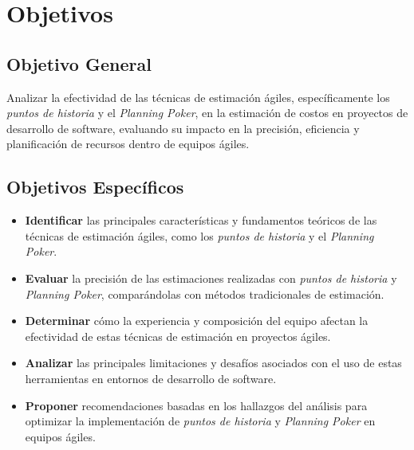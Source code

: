 \chapter{Objetivos}
\section{Objetivo General}

Analizar la efectividad de las técnicas de estimación ágiles, específicamente los \textit{puntos de historia} y el \textit{Planning Poker}, en la estimación de costos en proyectos de desarrollo de software, evaluando su impacto en la precisión, eficiencia y planificación de recursos dentro de equipos ágiles.

\section{Objetivos Específicos}

\begin{itemize}
    \item \textbf{Identificar} las principales características y fundamentos teóricos de las técnicas de estimación ágiles, como los \textit{puntos de historia} y el \textit{Planning Poker}.
    \item \textbf{Evaluar} la precisión de las estimaciones realizadas con \textit{puntos de historia} y \textit{Planning Poker}, comparándolas con métodos tradicionales de estimación.
    \item \textbf{Determinar} cómo la experiencia y composición del equipo afectan la efectividad de estas técnicas de estimación en proyectos ágiles.
    \item \textbf{Analizar} las principales limitaciones y desafíos asociados con el uso de estas herramientas en entornos de desarrollo de software.
    \item \textbf{Proponer} recomendaciones basadas en los hallazgos del análisis para optimizar la implementación de \textit{puntos de historia} y \textit{Planning Poker} en equipos ágiles.
\end{itemize}
